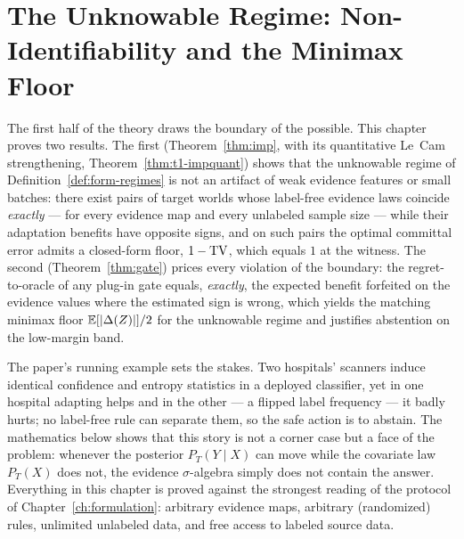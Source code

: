 
\chapter{The Unknowable Regime: Non-Identifiability and the Minimax Floor}\label{ch:theory1}

The first half of the theory draws the boundary of the possible. This
chapter proves two results. The first
(Theorem~\ref{thm:imp}, with its quantitative Le~Cam strengthening,
Theorem~\ref{thm:t1-impquant}) shows that the unknowable regime of
Definition~\ref{def:form-regimes} is not an artifact of weak evidence
features or small batches: there exist pairs of target worlds whose
label-free evidence laws coincide \emph{exactly} --- for every evidence map
and every unlabeled sample size --- while their adaptation benefits have
opposite signs, and on such pairs the optimal committal error admits a
closed-form floor, $1-\mathrm{TV}$, which equals $1$ at the witness. The second
(Theorem~\ref{thm:gate}) prices every violation of the boundary: the
regret-to-oracle of any plug-in gate equals, \emph{exactly}, the expected
benefit forfeited on the evidence values where the estimated sign is wrong,
which yields the matching minimax floor $\mathbb{E}[|\Delta(Z)|]/2$ for the
unknowable regime and justifies abstention on the low-margin band.

The paper's running example sets the stakes. Two hospitals' scanners induce
identical confidence and entropy statistics in a deployed classifier, yet in
one hospital adapting helps and in the other --- a flipped label frequency
--- it badly hurts; no label-free rule can separate them, so the safe action
is to abstain. The mathematics below shows that this story is not a corner
case but a face of the problem: whenever the posterior $P_T(Y\mid X)$ can
move while the covariate law $P_T(X)$ does not, the evidence
$\sigma$-algebra simply does not contain the answer. Everything in this
chapter is proved against the strongest reading of the protocol of
Chapter~\ref{ch:formulation}: arbitrary evidence maps, arbitrary
(randomized) rules, unlimited unlabeled data, and free access to labeled
source data.

